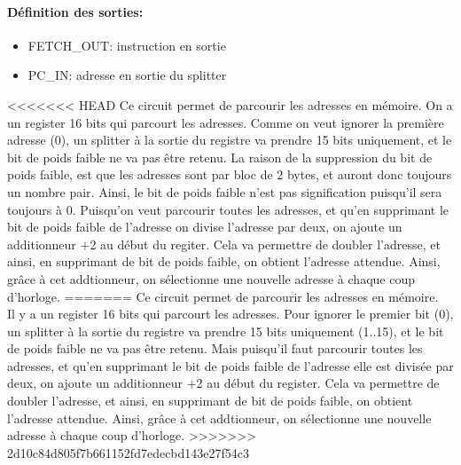 \documentclass[a4paper]{article} %
\begin{document}
\paragraph{Définition des sorties:}
\begin{itemize}
    \item FETCH\_OUT: instruction en sortie
    \item     PC\_IN: adresse en sortie du splitter
\end{itemize}
\medskip
<<<<<<< HEAD
Ce circuit permet de parcourir les adresses en mémoire. On a un register 16 bits qui parcourt les adresses. Comme on veut ignorer la première adresse (0), un splitter à la sortie du registre va prendre 15 bits uniquement, et le bit de poids faible ne va pas être retenu. La raison de la suppression du bit de poids faible, est que les adresses sont par bloc de 2 bytes, et auront donc toujours un nombre pair. Ainsi, le bit de poids faible n'est pas signification puisqu'il sera toujours à 0. Puisqu'on veut parcourir toutes les adresses, et qu'en supprimant le bit de poids faible de l'adresse on divise l'adresse par deux, on ajoute un additionneur +2 au début du regiter. Cela va permettre de doubler l'adresse, et ainsi, en supprimant de bit de poids faible, on obtient l'adresse attendue. Ainsi, grâce à cet addtionneur, on sélectionne une nouvelle adresse à chaque coup d'horloge.
=======
Ce circuit permet de parcourir les adresses en mémoire. \\
Il y a un register 16 bits qui parcourt les adresses. Pour ignorer le premier bit (0), un splitter à la sortie du registre va prendre 15 bits uniquement (1..15), et le bit de poids faible ne va pas être retenu. Mais puisqu'il faut parcourir toutes les adresses, et qu'en supprimant le bit de poids faible de l'adresse elle est divisée par deux, on ajoute un additionneur +2 au début du register. Cela va permettre de doubler l'adresse, et ainsi, en supprimant de bit de poids faible, on obtient l'adresse attendue. Ainsi, grâce à cet addtionneur, on sélectionne une nouvelle adresse à chaque coup d'horloge.
>>>>>>> 2d10c84d805f7b661152fd7edecbd143e27f54c3
\end{document}
